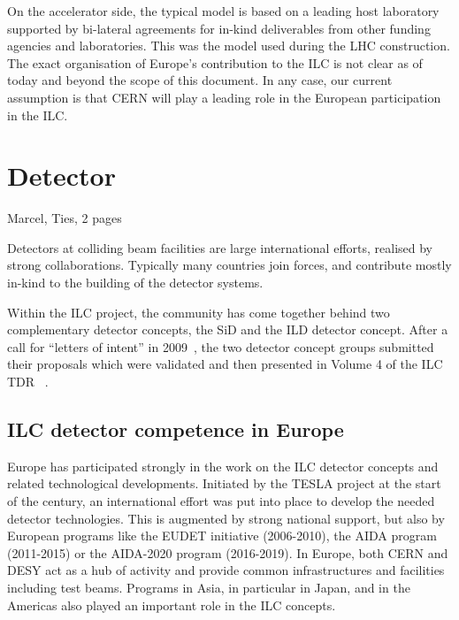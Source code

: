 \documentclass[%
 reprint,
 amsmath,amssymb,
 aps,
]{revtex4-1}
\begin{document}
On the accelerator side, the typical model is based on a leading host laboratory supported by 
bi-lateral agreements for in-kind deliverables from other funding agencies and 
laboratories. This was the model used during the LHC construction. 
The exact organisation of Europe's contribution to the ILC is not clear as of today 
and beyond the scope of this document. In any case, our current assumption is that 
CERN will play a leading role in the European participation in the ILC.




\section{\label{sec:det}Detector}
Marcel, Ties, 2 pages

Detectors at colliding beam facilities are large international efforts, realised by strong collaborations. 
Typically many countries join forces, and contribute mostly in-kind to the building of the detector systems. 

Within the ILC project, the community has come together behind two complementary detector concepts, the SiD and the ILD detector concept. 
After a call for ``letters of intent'' in 2009~\cite{Aihara:2009ad,Abe:2010aa}, the two detector concept groups submitted their proposals 
which were validated and then presented in Volume 4 of the ILC TDR ~\cite{Behnke:2013lya}.

\subsection{ILC detector competence in Europe~\label{sec:det:competence}}
Europe has participated strongly in the work on the ILC detector concepts and 
related technological developments. Initiated by the TESLA project at the start 
of the century, an international effort was put into place to develop the needed 
detector technologies. This is augmented by strong national support, but also by 
European programs like the EUDET initiative (2006-2010), the AIDA program 
(2011-2015) or the AIDA-2020 program (2016-2019). In Europe, both CERN and DESY 
act as a hub of activity and provide common infrastructures and facilities 
including test beams. Programs in Asia, in particular in Japan, and in the 
Americas also played an important role in the ILC concepts. 

\end{document}
